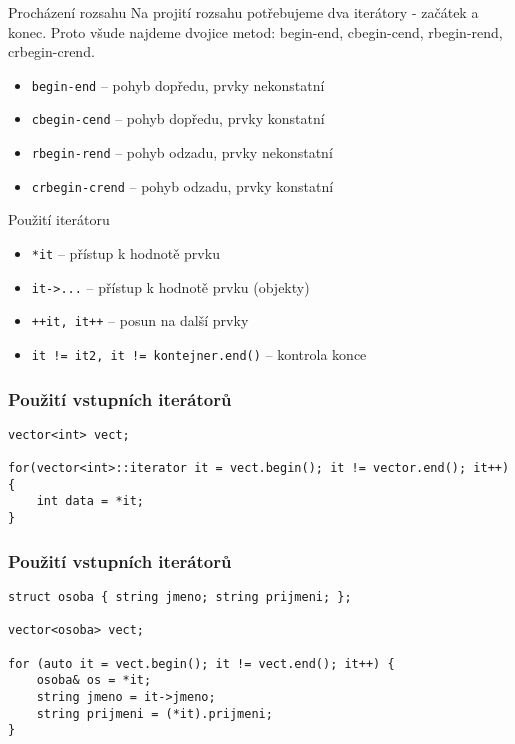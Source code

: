 \begin{frame}[fragile]
\begin{block}{Procházení rozsahu}
Na projití rozsahu potřebujeme dva iterátory - začátek a konec. Proto všude najdeme dvojice metod: begin-end, cbegin-cend, rbegin-rend, crbegin-crend.
	
\begin{itemize}
\item \lstinline|begin-end| -- pohyb dopředu, prvky nekonstatní
\item \lstinline|cbegin-cend| -- pohyb dopředu, prvky konstatní
\item \lstinline|rbegin-rend| -- pohyb odzadu, prvky nekonstatní
\item \lstinline|crbegin-crend| -- pohyb odzadu, prvky konstatní

\end{itemize}
\end{block}

\begin{exampleblock}{{\YES} Použití iterátoru}
\begin{itemize}
\item \lstinline|*it| -- přístup k hodnotě prvku
\item \lstinline|it->...| -- přístup k hodnotě prvku (objekty)
\item \lstinline|++it, it++| -- posun na další prvky
\item \lstinline|it != it2, it != kontejner.end()| -- kontrola konce
\end{itemize}
\end{exampleblock}
\end{frame}




\begin{frame}[fragile]
\frametitle{Použití vstupních iterátorů}
\begin{yesblock}
\begin{lstlisting}
vector<int> vect;

for(vector<int>::iterator it = vect.begin(); it != vector.end(); it++) {
	int data = *it;
}
\end{lstlisting}
\end{yesblock}
\end{frame}



\begin{frame}[fragile]
\frametitle{Použití vstupních iterátorů}
\begin{yesblock}
\begin{lstlisting}
struct osoba { string jmeno; string prijmeni; };

vector<osoba> vect;

for (auto it = vect.begin(); it != vect.end(); it++) {
	osoba& os = *it;
	string jmeno = it->jmeno;
	string prijmeni = (*it).prijmeni;
}
\end{lstlisting}
\end{yesblock}
\end{frame}


